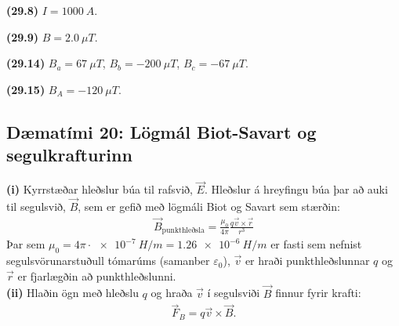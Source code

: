 \begin{tcolorbox}
\begin{enumerate*}[label = ]
  \item \textbf{(29.8)} $I = \SI{1000}{A}$.
  \item \textbf{(29.9)} $B = \SI{2.0}{\mu T}$.
  \item \textbf{(29.14)} $B_a = \SI{67}{\mu T}$, $B_b = -\SI{200}{\mu T}$, $B_c = -\SI{67}{\mu T}$.
  \item \textbf{(29.15)} $B_A = -\SI{120}{\mu T}$.
\end{enumerate*}
\end{tcolorbox}


\newpage


\subsection*{Dæmatími 20: Lögmál Biot-Savart og segulkrafturinn}

\begin{tcolorbox}
\textbf{(i)} Kyrrstæðar hleðslur búa til rafsvið, $\vec{E}$. Hleðslur á hreyfingu búa þar að auki til segulsvið, $\vec{B}$, sem er gefið með lögmáli Biot og Savart sem stærðin:
\begin{align*}
    \vec{B}_{\text{punkthleðsla}} = \frac{\mu_0}{4\pi} \frac{q \vec{v} \times \vec{r}}{r^3}
\end{align*}
Þar sem $\mu_0 = 4\pi \cdot \SI{e-7}{H/m} = \SI{1.26e-6}{H/m}$ er fasti sem nefnist segulsvörunarstuðull tómarúms (samanber $\varepsilon_0$), $\vec{v}$ er hraði punkthleðslunnar $q$ og $\vec{r}$ er fjarlægðin að punkthleðslunni. \\

\textbf{(ii)} Hlaðin ögn með hleðslu $q$ og hraða $\vec{v}$ í segulsviði $\vec{B}$ finnur fyrir krafti:
\begin{align*}
    \vec{F}_B = q \vec{v} \times \vec{B}.
\end{align*}
\end{tcolorbox}


